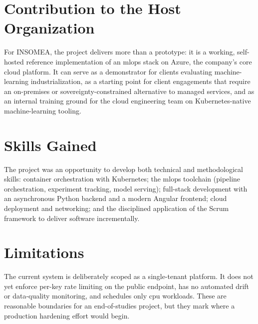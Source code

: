 \section*{Contribution to the Host Organization}
For INSOMEA, the project delivers more than a prototype: it is a working,
self-hosted reference implementation of an \gls{mlops} stack on Azure, the
company's core cloud platform. It can serve as a demonstrator for clients
evaluating machine-learning industrialization, as a starting point for client
engagements that require an on-premises or sovereignty-constrained alternative to
managed services, and as an internal training ground for the cloud engineering
team on Kubernetes-native machine-learning tooling.

\section*{Skills Gained}
The project was an opportunity to develop both technical and methodological
skills: container orchestration with Kubernetes; the \gls{mlops} toolchain
(pipeline orchestration, experiment tracking, model serving); full-stack
development with an asynchronous Python backend and a modern Angular frontend;
cloud deployment and networking; and the disciplined application of the Scrum
framework to deliver software incrementally.

\section*{Limitations}
The current system is deliberately scoped as a single-tenant platform. It does not
yet enforce per-key rate limiting on the public endpoint, has no automated drift or
data-quality monitoring, and schedules only \gls{cpu} workloads. These are
reasonable boundaries for an end-of-studies project, but they mark where a
production hardening effort would begin.

